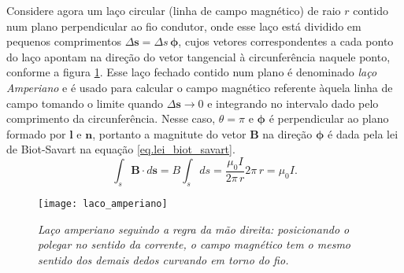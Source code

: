Considere agora um laço circular (linha de campo magnético) de raio $r$ contido num plano perpendicular ao fio condutor, onde esse laço está dividido em pequenos comprimentos $\Delta\textbf{s}=\Delta s\,\pmb{\phi}$, cujos vetores correspondentes a cada ponto do laço apontam na direção do vetor tangencial à circunferência naquele ponto, conforme  a figura \ref{fig.laco_amperiano}. Esse laço fechado contido num plano é denominado \textit{laço Amperiano} e é usado para calcular o campo magnético referente àquela linha de campo tomando o limite quando $\Delta\textbf{s}\to 0$ e integrando no intervalo dado pelo comprimento da circunferência. Nesse caso, $\theta=\pi$ e $\pmb{\phi}$ é perpendicular ao plano formado por $\textbf{l}$ e $\textbf{n}$, portanto a magnitute do vetor  $\textbf{B}$ na direção $\pmb{\phi}$ é dada pela lei de Biot-Savart na equação \ref{eq.lei_biot_savart}.
\begin{equation*}
\int_{s}\textbf{B}\cdot d\textbf{s}=B\int_{s}ds=\frac{\mu_0I}{2\pi\,r}2\pi\,r=\mu_0I.
\end{equation*} 
\begin{figure}[h]
\centering
\texttt{[image: laco\_amperiano]}
\caption{\textit{Laço amperiano seguindo a regra da mão direita: posicionando o polegar no sentido da corrente, o campo magnético tem o mesmo sentido dos demais dedos curvando em torno do fio.}}
\label{fig.laco_amperiano}
\end{figure}

